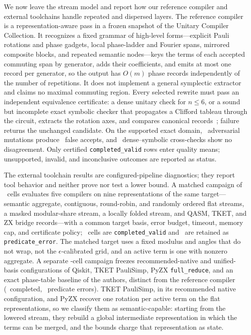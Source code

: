 \documentclass[aps,prx,reprint,superscriptaddress,floatfix,longbibliography]{revtex4-2}
\begin{document}
We now leave the stream model and report how our reference compiler and
external toolchains handle repeated and dispersed layers.  The reference
compiler is a representation-aware pass in a frozen snapshot of the
Unitary Compiler Collection.  It recognizes a fixed
grammar of high-level forms---explicit Pauli rotations and phase gadgets,
local phase-ladder and Fourier spans, mirrored composite blocks, and
repeated semantic nodes---keys the terms of each accepted commuting span by
generator, adds their coefficients, and emits at most one record per
generator, so the output has $O(m)$ phase records independently of the
number of repetitions.  It does not implement a general symplectic
extractor and claims no maximal commuting region.  Every selected rewrite
must pass an independent equivalence certificate: a dense unitary check for
$n\leq6$, or a sound but incomplete exact symbolic checker that propagates
a Clifford tableau through the circuit, extracts the rotation axes, and
compares canonical records~\cite{supplement}; failure returns the
unchanged candidate.  On the supported exact domain,
\CertificateMutationCases\ adversarial mutations produce
\CertificateFalseAccepts\ false accepts, and \CertificateCrosscheckCases\
dense--symbolic cross-checks show no disagreement.  Only certified
\texttt{completed\_valid} rows enter quality means; unsupported, invalid,
and inconclusive outcomes are reported as status.

The external toolchain results are configured-pipeline diagnostics; they
report tool behavior and neither prove nor test a lower bound.  A matched
campaign of \MatchedCells\ cells evaluates five compilers on nine
representations of the same target---semantic aggregate, contiguous,
round-robin, and randomly ordered flat streams, a masked modular-share
stream, a locally folded stream, and QASM, TKET, and ZX bridge
records---with a common target basis, error budget, timeout, memory cap,
and certificate policy; \MatchedCompleted\ cells are
\texttt{completed\_valid} and \MatchedPredicateErrors\ are retained as
\texttt{predicate\_error}.  The matched target uses a fixed modulus and
angles that do not wrap, not the $\epsilon$-calibrated grid, and an active
term is one with nonzero aggregate.  A separate \ExternalCells-cell
campaign freezes recommended-native and unified-basis configurations of
Qiskit, TKET PauliSimp, PyZX \texttt{full\_reduce}, and an exact
phase-table baseline of the authors, distinct from the reference compiler
(\ExternalCompleted\ completed, \ExternalPredicateErrors\ predicate
errors).  TKET PauliSimp, in its recommended native configuration, and
PyZX recover one rotation per active term on the flat representations, so
we classify them as semantic-capable: starting from the lowered stream,
they rebuild a global intermediate representation in which the terms can
be merged, and the bounds charge that representation as state.
\end{document}
